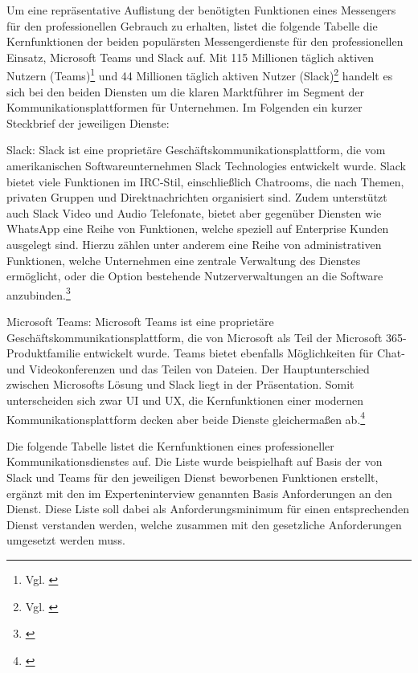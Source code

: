Um eine repräsentative Auflistung der benötigten Funktionen eines Messengers für den professionellen Gebrauch zu erhalten, listet die folgende Tabelle die Kernfunktionen der beiden populärsten Messengerdienste für den professionellen Einsatz, Microsoft Teams und Slack auf.
Mit 115 Millionen täglich aktiven Nutzern (Teams)\footnote{Vgl. \cite{Microsoft2020}} und 44 Millionen täglich aktiven Nutzer (Slack)\footnote{Vgl. \cite{Slack2020}} handelt es sich bei den beiden Diensten um die klaren Marktführer im Segment der Kommunikationsplattformen für Unternehmen. Im Folgenden ein kurzer Steckbrief der jeweiligen Dienste:

Slack: Slack ist eine proprietäre Geschäftskommunikationsplattform, die vom amerikanischen Softwareunternehmen Slack Technologies entwickelt wurde. Slack bietet viele Funktionen im IRC-Stil, einschließlich Chatrooms, die nach Themen, privaten Gruppen und Direktnachrichten organisiert sind. Zudem unterstützt auch Slack Video und Audio Telefonate, bietet aber gegenüber Diensten wie WhatsApp eine Reihe von Funktionen, welche speziell auf Enterprise Kunden ausgelegt sind. Hierzu zählen unter anderem eine Reihe von administrativen Funktionen, welche Unternehmen eine zentrale Verwaltung des Dienstes ermöglicht, oder die Option bestehende Nutzerverwaltungen an die Software anzubinden.\footnote{\cite{Slack2020}}

Microsoft Teams: Microsoft Teams ist eine proprietäre Geschäftskommunikationsplattform, die von Microsoft als Teil der Microsoft 365-Produktfamilie entwickelt wurde. Teams bietet ebenfalls Möglichkeiten für Chat- und Videokonferenzen und das Teilen von Dateien. Der Hauptunterschied zwischen Microsofts Lösung und Slack liegt in der Präsentation. Somit unterscheiden sich zwar UI und UX, die Kernfunktionen einer modernen Kommunikationsplattform decken aber beide Dienste gleichermaßen ab.\footnote{\cite{Microsoft2020}}

Die folgende Tabelle listet die Kernfunktionen eines professioneller Kommunikationsdienstes auf. Die Liste wurde beispielhaft auf Basis der von Slack und Teams für den jeweiligen Dienst beworbenen Funktionen erstellt, ergänzt mit den im Experteninterview genannten Basis Anforderungen an den Dienst. Diese Liste soll dabei als Anforderungsminimum für einen entsprechenden Dienst verstanden werden, welche zusammen mit den gesetzliche Anforderungen umgesetzt werden muss.

